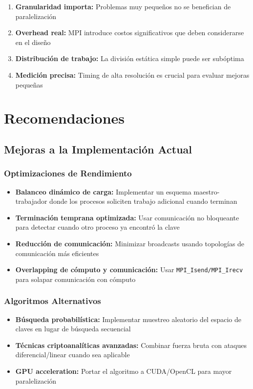 \documentclass[12pt,letterpaper]{article}
\begin{document}
\begin{enumerate}
    \item \textbf{Granularidad importa:} Problemas muy pequeños no se benefician de paralelización
    \item \textbf{Overhead real:} MPI introduce costos significativos que deben considerarse en el diseño
    \item \textbf{Distribución de trabajo:} La división estática simple puede ser subóptima
    \item \textbf{Medición precisa:} Timing de alta resolución es crucial para evaluar mejoras pequeñas
\end{enumerate}

\section{Recomendaciones}

\subsection{Mejoras a la Implementación Actual}

\subsubsection{Optimizaciones de Rendimiento}

\begin{itemize}
    \item \textbf{Balanceo dinámico de carga:} Implementar un esquema maestro-trabajador donde los procesos soliciten trabajo adicional cuando terminan
    \item \textbf{Terminación temprana optimizada:} Usar comunicación no bloqueante para detectar cuando otro proceso ya encontró la clave
    \item \textbf{Reducción de comunicación:} Minimizar broadcasts usando topologías de comunicación más eficientes
    \item \textbf{Overlapping de cómputo y comunicación:} Usar \texttt{MPI\_Isend/MPI\_Irecv} para solapar comunicación con cómputo
\end{itemize}

\subsubsection{Algoritmos Alternativos}

\begin{itemize}
    \item \textbf{Búsqueda probabilística:} Implementar muestreo aleatorio del espacio de claves en lugar de búsqueda secuencial
    \item \textbf{Técnicas criptoanalíticas avanzadas:} Combinar fuerza bruta con ataques diferencial/linear cuando sea aplicable
    \item \textbf{GPU acceleration:} Portar el algoritmo a CUDA/OpenCL para mayor paralelización
\end{itemize}
\end{document}
